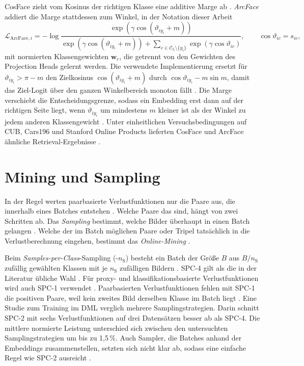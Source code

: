 CosFace zieht vom Kosinus der richtigen Klasse eine additive Marge ab \cite{wang_cosface_2018}. \emph{ArcFace} addiert die Marge stattdessen zum Winkel, in der Notation dieser Arbeit \cite{deng_arcface_2018,musgrave_pytorch_2020}
\begin{equation}
  \mathcal{L}_{\mathrm{ArcFace},i}=-\log\frac{\exp(\gamma\cos(\vartheta_{iy_i}+m))}{\exp(\gamma\cos(\vartheta_{iy_i}+m))+\sum_{c\in\mathcal{C}_{\mathrm{L}}\setminus\{y_i\}}\exp(\gamma\cos\vartheta_{ic})},\qquad \cos\vartheta_{ic}=s_{ic},
  \label{eq:arcface}
\end{equation}
mit normierten Klassengewichten $\bm{w}_c$, die getrennt von den Gewichten des Projection Heads gelernt werden. Die verwendete Implementierung ersetzt für $\vartheta_{iy_i}>\pi-m$ den Zielkosinus $\cos(\vartheta_{iy_i}+m)$ durch $\cos\vartheta_{iy_i}-m\sin m$, damit das Ziel-Logit über den ganzen Winkelbereich monoton fällt \cite{musgrave_pytorch_2020}. Die Marge verschiebt die Entscheidungsgrenze, sodass ein Embedding erst dann auf der richtigen Seite liegt, wenn $\vartheta_{iy_i}$ um mindestens $m$ kleiner ist als der Winkel zu jedem anderen Klassengewicht \cite{deng_arcface_2018}. Unter einheitlichen Versuchsbedingungen auf \ac{CUB}, Cars196 und Stanford Online Products lieferten CosFace und ArcFace ähnliche Retrieval-Ergebnisse \cite{musgrave_metric_2020}.

\section{Mining und Sampling}
\label{sec:sampling}

In der Regel werten paarbasierte Verlustfunktionen nur die Paare aus, die innerhalb eines Batches entstehen \cite{musgrave_metric_2020, musgrave_pytorch_2020}. Welche Paare das sind, hängt von zwei Schritten ab. Das \emph{Sampling} bestimmt, welche Bilder überhaupt in einen Batch gelangen \cite{roth_revisiting_2020, musgrave_pytorch_2020}. Welche der im Batch möglichen Paare oder Tripel tatsächlich in die Verlustberechnung eingehen, bestimmt das \emph{Online-Mining} \cite{musgrave_metric_2020, musgrave_pytorch_2020}.

Beim \emph{Samples-per-Class}-Sampling (-$n_{\mathrm{S}}$) besteht ein Batch der Größe $B$ aus $B/n_{\mathrm{S}}$ zufällig gewählten Klassen mit je $n_{\mathrm{S}}$ zufälligen Bildern \cite{musgrave_metric_2020, roth_revisiting_2020}. \ac{SPC}-4 gilt als die in der Literatur übliche Wahl \cite{roth_revisiting_2020}. Für proxy- und klassifikationsbasierte Verlustfunktionen wird auch \ac{SPC}-1 verwendet \cite{musgrave_metric_2020}. Paarbasierten Verlustfunktionen fehlen mit \ac{SPC}-1 die positiven Paare, weil kein zweites Bild derselben Klasse im Batch liegt \cite{berton_all_2025}. Eine Studie zum Training im \ac{DML} verglich mehrere Samplingstrategien. Darin schnitt \ac{SPC}-2 mit sechs Verlustfunktionen auf drei Datensätzen besser ab als \ac{SPC}-4. Die mittlere normierte Leistung unterschied sich zwischen den untersuchten Samplingstrategien um bis zu 1,5\,\%. Auch Sampler, die Batches anhand der Embeddings zusammenstellen, setzten sich nicht klar ab, sodass eine einfache Regel wie \ac{SPC}-2 ausreicht \cite{roth_revisiting_2020}.

